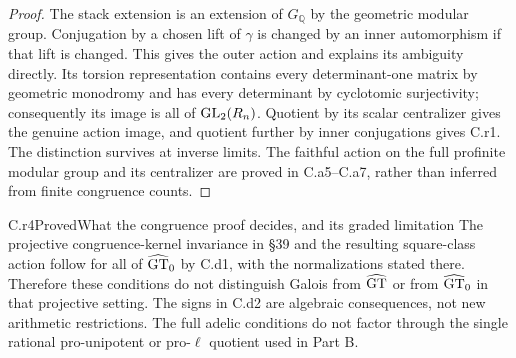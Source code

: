 \begin{proof}
The stack extension is an extension of $G_\mathbb Q$ by the geometric
modular group. Conjugation by a chosen lift of $\gamma$ is changed by
an inner automorphism if that lift is changed. This gives the outer
action and explains its ambiguity directly. Its torsion representation
contains every determinant-one matrix by geometric monodromy and has
every determinant by cyclotomic surjectivity; consequently its image
is all of $\operatorname{GL}_2(R_n)$. Quotient by its scalar centralizer gives the
genuine action image, and quotient further by inner conjugations gives
C.r1. The distinction survives at inverse limits. The faithful action
on the full profinite modular group and its centralizer are proved in
C.a5--C.a7, rather than inferred from finite congruence counts.
\end{proof}



\begin{claim}{C.r4}{Proved}{What the congruence proof decides, and its graded limitation}
The projective congruence-kernel invariance in \S39 and the resulting
square-class action follow for all of $\widehat{\mathrm{GT}}_0$ by C.d1, with the
normalizations stated there. Therefore these conditions do not
distinguish Galois from $\widehat{\mathrm{GT}}$ or from $\widehat{\mathrm{GT}}_0$ in that projective setting.
The signs in C.d2 are algebraic consequences, not new arithmetic
restrictions. The full adelic conditions do not factor through the
single rational pro-unipotent or pro-$\ell$ quotient used in Part B.
\end{claim}

